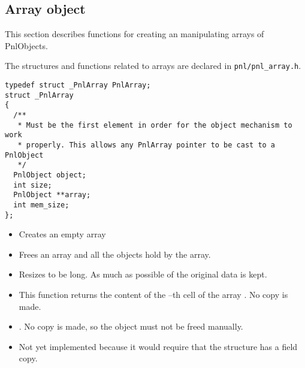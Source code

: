 \subsection{Array object}

This section describes functions for creating an manipulating arrays of
PnlObjects.

The structures and functions related to arrays are declared in
\verb!pnl/pnl_array.h!.

\begin{verbatim}
typedef struct _PnlArray PnlArray;
struct _PnlArray
{
  /**
   * Must be the first element in order for the object mechanism to work
   * properly. This allows any PnlArray pointer to be cast to a PnlObject
   */
  PnlObject object; 
  int size;
  PnlObject **array;
  int mem_size;
};
\end{verbatim}

\begin{itemize}
\item {}
  \sshortdescribe Creates an empty array
\item {}
  \sshortdescribe Frees an array and all the objects hold by the array.
\item {}
  \sshortdescribe Resizes  to be  long. As much as possible of
  the original data is kept.
\item {}
  \sshortdescribe This function returns the content of the --th cell of
  the array . No copy is made.
\item {}
  \sshortdescribe {}. No copy is made, so the object  must
  not be freed manually.
\item {}
  \sshortdescribe Not yet implemented because it would require that the
  structure  has a field copy.
\end{itemize}


